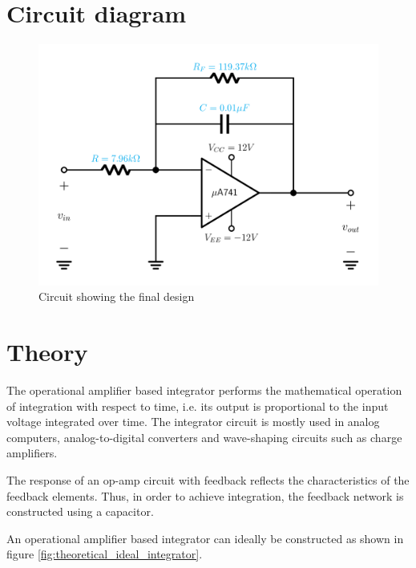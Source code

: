 \documentclass[12pt, titlepage]{article}
\theoremstyle{definition}
\begin{document}
  \newpage
  \section{Circuit diagram}
    \begin{figure}[h]
      \centering
      \includegraphics[scale=0.25]{images/designed_practical_integrator.png}
      \caption{Circuit showing the final design}
      \label{fig:designed_practical_integrator}
    \end{figure}

  \newpage
  \section{Theory}
    The operational amplifier based integrator performs the mathematical operation of integration with respect to time, i.e. its output is proportional to the input voltage integrated over time.
    The integrator circuit is mostly used in analog computers, analog-to-digital converters and wave-shaping circuits such as charge amplifiers.

    The response of an op-amp circuit with feedback reflects the characteristics of the feedback elements. Thus, in order to achieve integration, the feedback network is constructed using a capacitor.

    An operational amplifier based integrator can ideally be constructed as shown in figure \ref{fig:theoretical_ideal_integrator}.
\end{document}
